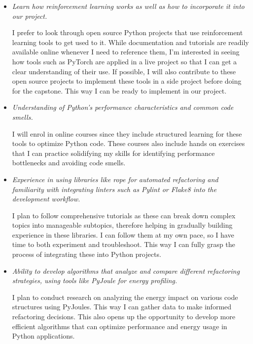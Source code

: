 \documentclass[12pt]{article}
\begin{document}
\begin{itemize}[label={}, wide=0pt, leftmargin=*]

  \item \textit{Learn how reinforcement learning works as well as how
    to incorporate it into our project.}

    I prefer to look through open source Python projects that use
    reinforcement learning tools to get used to it. While
    documentation and tutorials are readily available online whenever
    I need to reference them, I’m interested in seeing how tools such
    as PyTorch are applied in a live project so that I can get a
    clear understanding of their use. If possible, I will also
    contribute to these open source projects to implement these tools
    in a side project before doing for the capstone. This way I can
    be ready to implement in our project.

  \item \textit{Understanding of Python's performance characteristics
    and common code smells.}

    I will enrol in online courses since they include structured
    learning for these tools to optimize Python code. These courses
    also include hands on exercises that I can practice solidifying
    my skills for identifying performance bottlenecks and avoiding code smells.

  \item \textit{Experience in using libraries like rope for automated
      refactoring and familiarity with integrating linters such as
    Pylint or Flake8 into the development workflow.}

    I plan to follow comprehensive tutorials as these can break down
    complex topics into manageable subtopics, therefore helping in
    gradually building experience in these libraries. I can follow
    them at my own pace, so I have time to both experiment and
    troubleshoot. This way I can fully grasp the process of
    integrating these into Python projects.

  \item \textit{Ability to develop algorithms that analyze and
      compare different refactoring strategies, using tools like
    PyJoule for energy profiling.}

    I plan to conduct research on analyzing the energy impact on
    various code structures using PyJoules. This way I can gather
    data to make informed refactoring decisions. This also opens up
    the opportunity to develop more efficient algorithms that can
    optimize performance and energy usage in Python applications.


\end{itemize}
\end{document}
